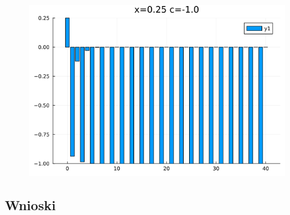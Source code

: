 \documentclass{article}
\begin{document}
        \begin{figure}[H]
        \centering
        \includegraphics[width=0.75\linewidth]{6 x=0.25 c=-1.0.png}
        \label{fig:enter-label}
    \end{figure}
    \subsection{Wnioski}
\end{document}
